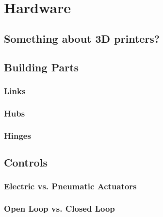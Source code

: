 \chapter{Hardware}\label{ch:hardware}
\section{Something about 3D printers?}
\clearpage
\section{Building Parts}
\subsection{Links}
\subsection{Hubs}
\subsection{Hinges}
\clearpage
\section{Controls}
\subsection{Electric vs. Pneumatic Actuators}
\subsection{Open Loop vs. Closed Loop}
